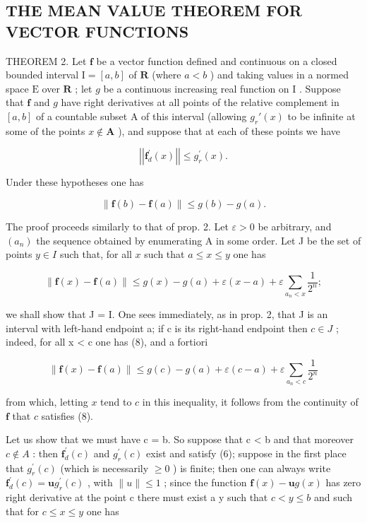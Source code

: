 \subsection{THE MEAN VALUE THEOREM FOR VECTOR FUNCTIONS}

THEOREM 2. Let \(\mathbf{f}\) be a vector function defined and continuous on a closed bounded interval \(\mathrm{I} = [a, b]\) of \(\mathbf{R}\) (where \(a < b\) ) and taking values in a normed space \(\mathrm{E}\) over \(\mathbf{R}\) ; let \(g\) be a continuous increasing real function on \(\mathrm{I}\) . Suppose that \(\mathbf{f}\) and \(g\) have right derivatives at all points of the relative complement in \([a, b]\) of a countable subset A of this interval (allowing \(g_r'(x)\) to be infinite at some of the points \(x \notin \mathbf{A}\) ), and suppose that at each of these points we have

\[
\left| \left| \mathbf {f} _ {d} ^ {\prime} (x) \right| \right| \leqslant g _ {r} ^ {\prime} (x).\tag{6}
\]

Under these hypotheses one has

\[
\| \mathbf {f} (b) - \mathbf {f} (a) \| \leqslant g (b) - g (a).\tag{7}
\]

The proof proceeds similarly to that of prop. 2. Let \(\varepsilon > 0\) be arbitrary, and \((a_{n})\) the sequence obtained by enumerating A in some order. Let J be the set of points \(y \in I\) such that, for all \(x\) such that \(a \leqslant x \leqslant y\) one has

\[
\| \mathbf {f} (x) - \mathbf {f} (a) \| \leqslant g (x) - g (a) + \varepsilon (x - a) + \varepsilon \sum_ {a _ {n} <   x} \frac {1}{2 ^ {n}};\tag{8}
\]

we shall show that J = I. One sees immediately, as in prop. 2, that J is an interval with left-hand endpoint a; if c is its right-hand endpoint then \(c \in J\) ; indeed, for all x \textless{} c one has (8), and a fortiori

\[
\| \mathbf {f} (x) - \mathbf {f} (a) \| \leqslant g (c) - g (a) + \varepsilon (c - a) + \varepsilon \sum_ {a _ {n} <   c} \frac {1}{2 ^ {n}}
\]

from which, letting \(x\) tend to \(c\) in this inequality, it follows from the continuity of \(\mathbf{f}\) that \(c\) satisfies (8).

Let us show that we must have c = b. So suppose that c \textless{} b and that moreover \(c \notin A\) : then \(\mathbf{f}_{d}^{\prime}(c)\) and \(g_{r}^{\prime}(c)\) exist and satisfy (6); suppose in the first place that \(g_{r}^{\prime}(c)\) (which is necessarily \(\geqslant 0\) ) is finite; then one can always write \(\mathbf{f}_{d}^{\prime}(c) = \mathbf{u}g_{r}^{\prime}(c)\) , with \(\|u\| \leqslant 1\) ; since the function \(\mathbf{f}(x) - \mathbf{u}g(x)\) has zero right derivative at the point c there must exist a y such that \(c < y \leqslant b\) and such that for \(c \leqslant x \leqslant y\) one has

